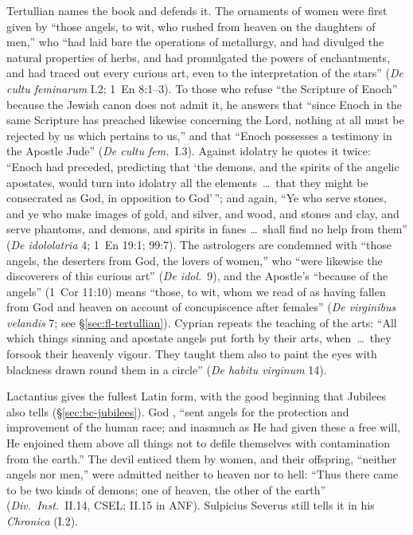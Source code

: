 Tertullian names the book and defends it. The ornaments of women were
first given by ``those angels, to wit, who rushed from heaven on the
daughters of men,'' who ``had laid bare the operations of metallurgy, and
had divulged the natural properties of herbs, and had promulgated the powers
of enchantments, and had traced out every curious art, even to the
interpretation of the stars'' (\emph{De cultu feminarum} I.2; 1~En 8:1--3).
To those who refuse ``the Scripture of Enoch'' because the Jewish canon does
not admit it, he answers that ``since Enoch in the same Scripture has
preached likewise concerning the Lord, nothing at all must be rejected by us
which pertains to us,'' and that ``Enoch possesses a testimony in the
Apostle Jude'' (\emph{De cultu fem.}\ I.3). Against idolatry he quotes it
twice: ``Enoch had preceded, predicting that `the demons, and the spirits
of the angelic apostates, would turn into idolatry all the elements~\dots\
that they might be consecrated as God, in opposition to God'\,''; and again,
``Ye who serve stones, and ye who make images of gold, and silver, and wood,
and stones and clay, and serve phantoms, and demons, and spirits in fanes
\dots\ shall find no help from them'' (\emph{De idololatria} 4; 1~En 19:1;
99:7). The astrologers are condemned with ``those angels, the deserters from
God, the lovers of women,'' who ``were likewise the discoverers of this
curious art'' (\emph{De idol.}\ 9), and the Apostle's ``because of the
angels'' (1~Cor 11:10) means ``those, to wit, whom we read of as having
fallen from God and heaven on account of concupiscence after females''
(\emph{De virginibus velandis} 7; see \S\ref{sec:fl-tertullian}). Cyprian
repeats the teaching of the arts: ``All which things sinning and apostate
angels put forth by their arts, when~\dots\ they forsook their heavenly
vigour. They taught them also to paint the eyes with blackness drawn round
them in a circle'' (\emph{De habitu virginum} 14).

Lactantius gives the fullest Latin form, with the good beginning that
Jubilees also tells (\S\ref{sec:bc-jubilees}). God \latin{misit angelos ad
tutelam cultumque generis humani}, ``sent angels for the protection and
improvement of the human race; and inasmuch as He had given these a free
will, He enjoined them above all things not to defile themselves with
contamination from the earth.'' The devil enticed them by women, and their
offspring, ``neither angels nor men,'' were admitted neither to heaven nor to
hell: ``Thus there came to be two kinds of demons; one of heaven, the other
of the earth'' (\emph{Div.\ Inst.}\ II.14, CSEL; II.15 in ANF). Sulpicius
Severus still tells it in his \emph{Chronica} (I.2).


